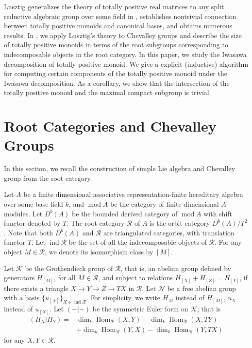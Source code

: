 \documentclass[12pt]{amsart}
\begin{document}
Lusztig generalizes the theory of totally positive real matrices to any split reductive algebraic group over some field in \cite{TR1,TR2}, establishes nontrivial connection between totally positive monoids and canonical bases, and obtains numerous results.
In \cite{notes3}, we apply Lusztig's theory to Chevalley groups and describe the size of totally positive monoids in terms of the root subgroups corresponding to indecomposable objects in the root category.
In this paper, we study the Iwasawa decomposition of totally positive monoid.
We give a explicit (inductive) algorithm for computing certain components of the totally positive monoid under the Iwasawa decomposition.
As a corollary, we show that the intersection of the totally positive monoid and the maximal compact subgroup is trivial.













\section{Root Categories and Chevalley Groups}
In this section, we recall the construction of simple Lie algebra \cite{1997ROOT} and Chevalley group \cite{notes1} from the root category.

Let $A$ be a finite dimensional associative representation-finite hereditary algebra over some base field $k$, and $\operatorname{mod}A$ be the category of finite dimensional $A$-modules. 
Let $D^b(A)$ be the bounded derived category of $\operatorname{mod}A$ with shift functor denoted by $T$. 
The root category $\mathcal{R}$ of $A$ is the orbit category $D^b(A)/T^2$.
Note that both $D^b(A)$ and $\mathcal{R}$ are triangulated categories, with translation functor $T$.
Let $\operatorname{ind}\mathcal{R}$ be the set of all the indecomposable objects of $\mathcal{R}$. For any object $M\in \mathcal{R}$, we denote its isomorphism class by $[M]$.

Let $\mathcal{K}$ be the Grothendieck group of $\mathcal{R}$, that is, an abelian group defined by generators $H_{[M]}$, for all $M\in \mathcal{R}$, and subject to relations $H_{[X]}+H_{[Z]}=H_{[Y]}$, if there exists a triangle $X\rightarrow Y\rightarrow Z \rightarrow TX$ in $\mathcal{R}$.
Let $\mathcal{N}$ be a free abelian group with a basis $\{u_{[X]}\}_{X\in \operatorname{ind}\mathcal{R}}$. For simplicity, we write $H_M$ instead of $H_{[M]}$, $u_X$ instead of $u_{[X]}$.
Let $(-|-)$ be the symmetric Euler form on $\mathcal{K}$, that is 
\begin{align*}
    (H_X|H_Y)=&\operatorname{dim}_k\operatorname{Hom}_{\mathcal{R}}(X,Y)-\operatorname{dim}_k\operatorname{Hom}_{\mathcal{R}}(X,TY) \\
        &+\operatorname{dim}_k\operatorname{Hom}_{\mathcal{R}}(Y,X)-\operatorname{dim}_k\operatorname{Hom}_{\mathcal{R}}(Y,TX)
\end{align*}
for any $X,Y\in \mathcal{R}$.
\end{document}
